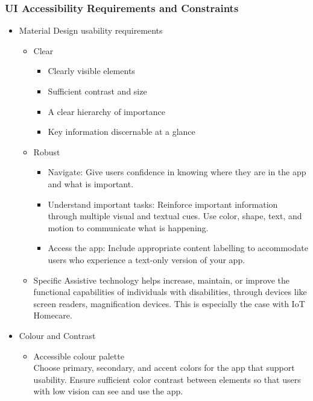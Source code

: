 \subsubsection{UI Accessibility Requirements and Constraints}
     \begin{itemize}
   \item Material Design usability requirements

   		\begin{itemize}
    		\item{Clear}
            	\begin{itemize}
                	\item{Clearly visible elements}
                    \item{Sufficient contrast and size}
                    \item{A clear hierarchy of importance}
                    \item{Key information discernable at a glance}
            	\end{itemize}
        	\item{Robust}
            	\begin{itemize}
                	\item{Navigate: Give users confidence in knowing where they are in the app and what is important.}
                    \item{Understand important tasks: Reinforce important information through multiple visual and textual cues. Use color, shape, text, and motion to communicate what is happening.}
                    \item{Access the app: Include appropriate content labelling to accommodate users who experience a text-only version of your app.}
            	\end{itemize}
        	\item{Specific}
            Assistive technology helps increase, maintain, or improve the functional capabilities of individuals with disabilities, through devices like screen readers, magnification devices. This is especially the case with IoT Homecare.
        \end{itemize}
   \item Colour and Contrast
     \begin{itemize}
       \item Accessible colour palette\\
       Choose primary, secondary, and accent colors for the app that support usability. Ensure sufficient color contrast between elements so that users with low vision can see and use the app.


\end{itemize}
\end{itemize}
